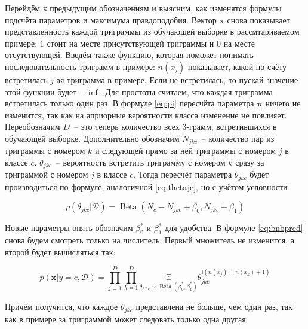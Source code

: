 Перейдём к предыдущим обозначениям и выясним, как изменятся формулы подсчёта параметров и максимума
правдоподобия. Вектор $\mathbf{x}$ снова показывает представленность каждой триграммы из обучающей
выборке в рассмтариваемом примере: $1$ стоит на месте присутствующей триграммы и $0$ на месте
отсутствующей. Введём также функцию, которая поможет понимать последовательность триграмм в примере:
$n(x_{j})$ показывает, какой по счёту встретилась $j$-ая триграмма в примере. Если не встретилась,
то пускай значение этой функции будет $-\inf$. Для простоты считаем,
что каждая триграмма встретилась только один раз. В формуле \ref{eq:pi} пересчёта параметра $\mathbf{\pi}$ ничего не изменится, так как
на априорные вероятности класса изменение не повлияет. Переобозначим $D$~-- это теперь количество всех
3-грамм, встретившихся в обучающей выборке. Дополнительно обозначим $N_{jkc}$~--
количество пар из триграммы с номером $k$ и следующей прямо за ней триграммы с номером $j$ в классе $c$.
$\theta_{jkc}$~-- вероятность встретить триграмму с номером $k$ сразу за триграммой с номером $j$ в
классе $c$. Тогда пересчёт параметра $\theta_{jkc}$ будет производиться по формуле, аналогичной
\ref{eq:thetajc}, но с учётом условности

\begin{equation}
  p(\theta_{jkc}|\mathcal{D}) = \operatorname{Beta}(N_c-N_{jkc}+\beta_0, N_{jkc}+\beta_1)
  \label{eq:thetajkc}
\end{equation}

Новые параметры опять обозначим $\beta_0^*$ и $\beta_1^*$ для удобства. В формуле \ref{eq:bnbpred} снова будем смотреть только на числитель. Первый множитель не изменится,
а второй будет вычисляться так:

\begin{equation}
   p(\mathbf{x}|y=c,\mathcal{D}) =
   \prod_{j=1}^D\prod_{k=1}^D\underset{\theta_{**c}\sim\operatorname{Beta}(\beta_0^*,\beta_1^*)}{\mathbb{E}}\theta_{jkc}^{\mathbb{I}(n(x_{j})=n(x_{k})+1)}
   \label{eq:maththetagr}
\end{equation}

Причём получится, что каждое $\theta_{jkc}$ представлена не больше, чем один раз, так как в примере
за триграммой может следовать только одна другая.
